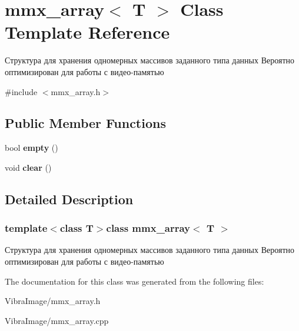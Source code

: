 \hypertarget{classmmx__array}{\section{mmx\+\_\+array$<$ T $>$ Class Template Reference}
\label{classmmx__array}
}


Структура для хранения одномерных массивов заданного типа данных Вероятно оптимизирован для работы с видео-\/памятью  




{\ttfamily \#include $<$mmx\+\_\+array.\+h$>$}

\subsection*{Public Member Functions}
\begin{DoxyCompactItemize}
\item 
\hypertarget{classmmx__array_ad16d7bd1ebebc364a791f011d2d5f9d1}{bool {\bfseries empty} ()}\label{classmmx__array_ad16d7bd1ebebc364a791f011d2d5f9d1}

\item 
\hypertarget{classmmx__array_a5da7e05a539fbfb916289d32ae540a9e}{void {\bfseries clear} ()}\label{classmmx__array_a5da7e05a539fbfb916289d32ae540a9e}

\end{DoxyCompactItemize}


\subsection{Detailed Description}
\subsubsection*{template$<$class T$>$class mmx\+\_\+array$<$ T $>$}

Структура для хранения одномерных массивов заданного типа данных Вероятно оптимизирован для работы с видео-\/памятью 



The documentation for this class was generated from the following files\+:\begin{DoxyCompactItemize}
\item 
Vibra\+Image/mmx\+\_\+array.\+h\item 
Vibra\+Image/mmx\+\_\+array.\+cpp\end{DoxyCompactItemize}
